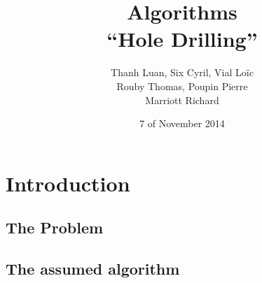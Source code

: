 \documentclass[11pt]{article}
\title{Algorithms \\
	\textbf{``Hole Drilling''}}
\author{Thanh Luan, Six Cyril, Vial Loïc \\
			Rouby Thomas, Poupin Pierre\\
			Marriott Richard}
\date{7\up{th} of November 2014}
\begin{document}
\maketitle
\tableofcontents

\section{Introduction}
\subsection{The Problem}

\subsection{The assumed algorithm}



\newcommand{\notalphagraph}[1] {
	\begin{tikzpicture}[scale=0.7]
			\def\n{#1}
			\def\height{6}
			\def\width{6}
			\foreach \x in {0,\width} {
				\foreach \y in {0,2,...,\n} {
					\draw [fill] ($(\x,\y*\height/\n)$) circle [radius=0.1];
					\draw [red,middlearrow1={latex},thick] ($(0,\y*\height/\n)$) -- ($(\width,\y*\height/\n)$);
					\ifnum \y > 0 {
						\draw [red,middlearrow1={latex},thick] ($(\width,\y*\height/\n)$) -- ($(\width,\y*\height/\n - \height/\n)$);
						\draw [red,middlearrow1={latex},thick] ($(\width,\y*\height/\n - \height/\n)$) -- ($(0,\y*\height/\n - \height/\n)$);
						\draw [red,middlearrow1={latex},thick] ($(0,\y*\height/\n - \height/\n)$) -- ($(0,\y*\height/\n - \height/\n - \height/\n)$);
					} \else
					\fi
				}
			}
			\draw [red,middlearrow1={latex},thick] (0,0) -- (\width,0);

			\foreach \x in {0,\width} {
				\foreach \y in {0,...,\n} {
					\draw [fill] ($(\x,\y*\height/\n)$) circle [radius=0.1];
				}
			}
			\draw [blue,middlearrow2={latex},thick] (0.05,\height+0.05) -- (0.05,0.05);
			\draw [blue,middlearrow2={latex},thick] (0.05,0.05) -- (\width+0.05,0.05);
			\draw [blue,middlearrow2={latex},thick] (\width+0.05,0.05) -- (\width+0.05,\height+0.05);
		\end{tikzpicture}
}

\newcommand{\notAlphaGraphOnlyRed}[1] {
	\begin{tikzpicture}[scale=0.85]
			\def\n{#1}
			\def\height{5}
			\def\width{5}
			\foreach \x in {0,\width} {
				\foreach \y in {0,...,\n} {
					\draw [fill] ($(\x,\y*\height/\n)$) circle [radius=0.1];
					\draw [red,middlearrow1={latex},thick] ($(0,\y*\height/\n)$) -- ($(\width,\y*\height/\n)$);
					\ifnum \y > 0 {
						\draw [red,middlearrow1={latex},thick] ($(\width,\y*\height/\n)$) -- ($(0,\y*\height/\n - \height/\n)$);
					} \else
					\fi
				}
			}
		\end{tikzpicture}
}
\end{document}
